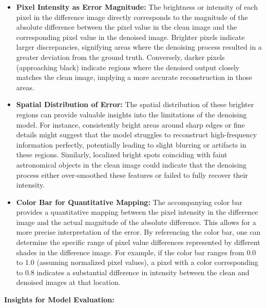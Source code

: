 \documentclass[12pt, conference]{IEEEtran}
\begin{document}
\begin{itemize}
    \item \textbf{Pixel Intensity as Error Magnitude:} The brightness or intensity of each pixel in the difference image directly corresponds to the magnitude of the absolute difference between the pixel value in the clean image and the corresponding pixel value in the denoised image. Brighter pixels indicate larger discrepancies, signifying areas where the denoising process resulted in a greater deviation from the ground truth. Conversely, darker pixels (approaching black) indicate regions where the denoised output closely matches the clean image, implying a more accurate reconstruction in those areas.
    \item \textbf{Spatial Distribution of Error:} The spatial distribution of these brighter regions can provide valuable insights into the limitations of the denoising model. For instance, consistently bright areas around sharp edges or fine details might suggest that the model struggles to reconstruct high-frequency information perfectly, potentially leading to slight blurring or artifacts in these regions. Similarly, localized bright spots coinciding with faint astronomical objects in the clean image could indicate that the denoising process either over-smoothed these features or failed to fully recover their intensity.
    \item \textbf{Color Bar for Quantitative Mapping:} The accompanying color bar provides a quantitative mapping between the pixel intensity in the difference image and the actual magnitude of the absolute difference. This allows for a more precise interpretation of the error. By referencing the color bar, one can determine the specific range of pixel value differences represented by different shades in the difference image. For example, if the color bar ranges from 0.0 to 1.0 (assuming normalized pixel values), a pixel with a color corresponding to 0.8 indicates a substantial difference in intensity between the clean and denoised images at that location.
\end{itemize}


\textbf{Insights for Model Evaluation:}
\end{document}
